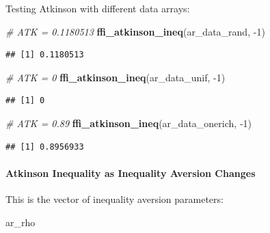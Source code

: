 \documentclass[
]{book}
\newenvironment{Shaded}{\begin{snugshade}}{\end{snugshade}}
\newcommand{\CommentTok}[1]{\textcolor[rgb]{0.56,0.35,0.01}{\textit{#1}}}
\newcommand{\DecValTok}[1]{\textcolor[rgb]{0.00,0.00,0.81}{#1}}
\newcommand{\KeywordTok}[1]{\textcolor[rgb]{0.13,0.29,0.53}{\textbf{#1}}}
\newcommand{\NormalTok}[1]{#1}
\begin{document}
Testing Atkinson with different data arrays:

\begin{Shaded}
\begin{Highlighting}[]
\CommentTok{\# ATK = 0.1180513}
\KeywordTok{ffi\_atkinson\_ineq}\NormalTok{(ar\_data\_rand, }\DecValTok{{-}1}\NormalTok{)}
\end{Highlighting}
\end{Shaded}

\begin{verbatim}
## [1] 0.1180513
\end{verbatim}

\begin{Shaded}
\begin{Highlighting}[]
\CommentTok{\# ATK = 0}
\KeywordTok{ffi\_atkinson\_ineq}\NormalTok{(ar\_data\_unif, }\DecValTok{{-}1}\NormalTok{)}
\end{Highlighting}
\end{Shaded}

\begin{verbatim}
## [1] 0
\end{verbatim}

\begin{Shaded}
\begin{Highlighting}[]
\CommentTok{\# ATK = 0.89}
\KeywordTok{ffi\_atkinson\_ineq}\NormalTok{(ar\_data\_onerich, }\DecValTok{{-}1}\NormalTok{)}
\end{Highlighting}
\end{Shaded}

\begin{verbatim}
## [1] 0.8956933
\end{verbatim}

\hypertarget{atkinson-inequality-as-inequality-aversion-changes}{%
\paragraph{Atkinson Inequality as Inequality Aversion Changes}\label{atkinson-inequality-as-inequality-aversion-changes}}

This is the vector of inequality aversion parameters:

\begin{Shaded}
\begin{Highlighting}[]
\NormalTok{ar\_rho}
\end{Highlighting}
\end{Shaded}
\end{document}
